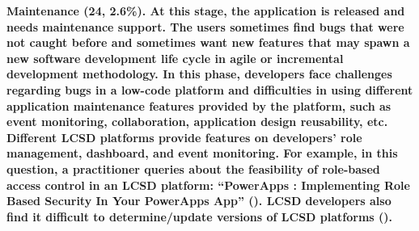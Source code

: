 \bf{Maintenance (24, 2.6\%).} At this stage, the application is released and needs maintenance support. The users sometimes find bugs that were not caught before and sometimes want new features that may spawn a new software development life cycle in agile or incremental development methodology. In this phase, developers face challenges regarding bugs in a low-code platform and difficulties in using different application maintenance features provided by the platform, such as event monitoring, collaboration, application design reusability, etc. Different LCSD platforms provide features on developers' role management, dashboard, and event monitoring. For example, in this question, a practitioner queries about the feasibility of role-based access control in an LCSD platform: ``PowerApps : Implementing Role Based Security In Your PowerApps App'' (). LCSD developers also find it difficult to determine/update versions of LCSD platforms (). 


